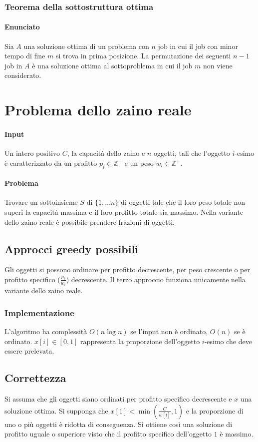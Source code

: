 \subsubsection{Teorema della sottostruttura ottima}
\paragraph{Enunciato}
Sia $A$ una soluzione ottima di un problema con $n$ job in cui il job con minor tempo di fine $m$ si trova in prima posizione. La permutazione dei seguenti $n-1$ job in $A$ \`e una
soluzione ottima al sottoproblema in cui il job $m$ non viene considerato. 
\section{Problema dello zaino reale}
\paragraph{Input}
Un intero positivo $C$, la capacit\`a dello zaino e $n$ oggetti, tali che l'oggetto $i$-esimo \`e caratterizzato da un profitto $p_i\in\mathbb{Z}^+$ e un peso $w_i\in\mathbb{Z}^+$.
\paragraph{Problema}
Trovare un sottoinsieme $S$ di $\{1,\dots n\}$ di oggetti tale che il loro peso totale non superi la capacit\`a massima e il loro profitto totale sia massimo. Nella variante dello zaino
reale \`e possibile prendere frazioni di oggetti.
\subsection{Approcci greedy possibili}
Gli oggetti si possono ordinare per profitto decrescente, per peso crescente o per profitto specifico ($\frac{p_i}{w_i}$) decrescente. Il terzo approccio funziona unicamente nella
variante dello zaino reale.
\subsubsection{Implementazione}

L'algoritmo ha complessit\`a $O(n\log n)$ se l'input non \`e ordinato, $O(n)$ se \`e ordinato. $x[i]\in[0, 1]$ rappresenta la proporzione dell'oggetto $i$-esimo che deve essere 
prelevata.
\subsection{Correttezza}
Si assuma che gli oggetti siano ordinati per profitto specifico decrescente e $x$ una soluzione ottima. Si supponga che $x[1] < \min(\frac{C}{w[i]}, 1)$ e la proporzione di uno o pi\`u
oggetti \`e ridotta di conseguenza. Si ottiene cos\`i una soluzione di profitto uguale o superiore visto che il profitto specifico dell'oggetto $1$ \`e massimo. 
